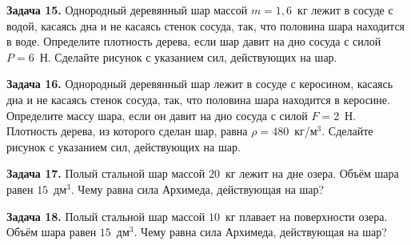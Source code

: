 \begin{taskbasic}[code={\label{task:fluid_ball_bottom_water}}]
\textbf{Задача 15.} Однородный деревянный шар массой $m = 1{,}6$~кг лежит в сосуде с водой, касаясь дна и не касаясь стенок сосуда, так, что половина шара находится в воде. Определите плотность дерева, если шар давит на дно сосуда с силой $P = 6$~Н. Сделайте рисунок с указанием сил, действующих на шар.

\end{taskbasic}

\begin{taskbasic}[code={\label{task:fluid_ball_bottom_kerosene}}]
\textbf{Задача 16.} Однородный деревянный шар лежит в сосуде с керосином, касаясь дна и не касаясь стенок сосуда, так, что половина шара находится в керосине. Определите массу шара, если он давит на дно сосуда с силой $F = 2$~Н. Плотность дерева, из которого сделан шар, равна $\rho = 480$~кг/м$^3$. Сделайте рисунок с указанием сил, действующих на шар.

\end{taskbasic}

\begin{taskbasic}[code={\label{task:fluid_hollow_ball_lake}}]
\textbf{Задача 17.} Полый стальной шар массой $20$~кг лежит на дне озера. Объём шара равен $15$~дм$^3$. Чему равна сила Архимеда, действующая на шар?

\end{taskbasic}

\begin{taskbasic}[code={\label{task:fluid_hollow_ball_float}}]
\textbf{Задача 18.} Полый стальной шар массой $10$~кг плавает на поверхности озера. Объём шара равен $15$~дм$^3$. Чему равна сила Архимеда, действующая на шар?

\end{taskbasic}

